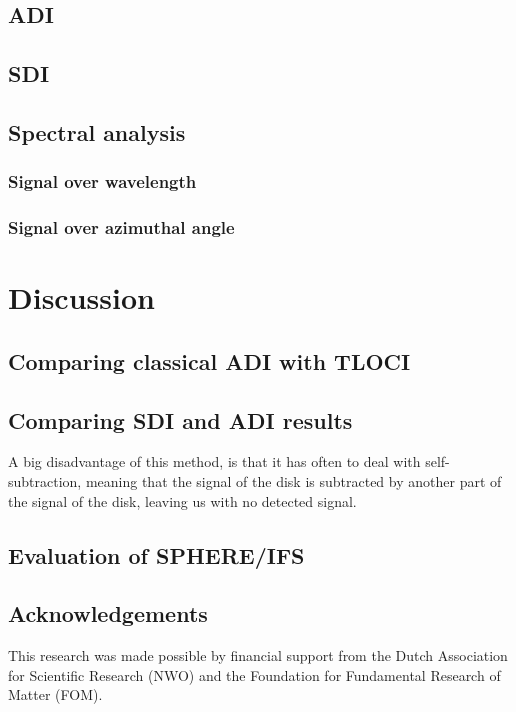 \documentclass[twoside,single]{lion-msc}
\begin{document}
\section{ADI}
\section{SDI}
\section{Spectral analysis}
\subsection{Signal over wavelength}
\subsection{Signal over azimuthal angle}

\chapter{Discussion}
\section{Comparing classical ADI with TLOCI}
\section{Comparing SDI and ADI results}
A big disadvantage of this method, is that it has often to deal with self-subtraction, meaning that the signal of the disk is subtracted by another part of the signal of the disk, leaving us with no detected signal. 
\section{Evaluation of SPHERE/IFS}





%

%

\section*{Acknowledgements}
This research was made possible by financial support from the Dutch Association for Scientific Research (NWO) and the Foundation for Fundamental Research of Matter (FOM).
\end{document}
